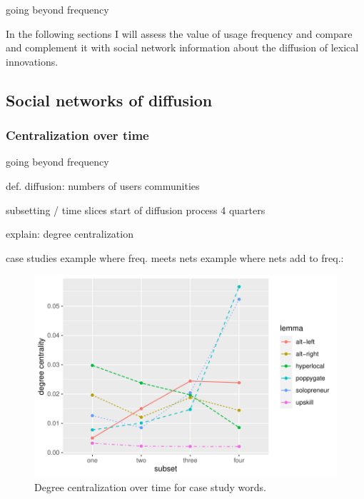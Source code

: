 \documentclass[
  a4paper,
  abstract=on,
  captions=tableabove
  ]{scrartcl}
\begin{document}
  going beyond frequency

    In the following sections I will assess the value of usage frequency and compare and complement it with social network information about the diffusion of lexical innovations.

  \subsection{Social networks of diffusion}
    \label{subsec:sna}

    \subsubsection{Centralization over time}

  going beyond frequency

  def. diffusion:
    numbers of users
    communities

  subsetting / time slices
    start of diffusion process
    4 quarters

  explain: degree centralization

  case studies
    example where freq. meets nets
    example where nets add to freq.: 


      \begin{figure}[H]
        \caption{Degree centralization over time for case study words.}
        \centering
        \includegraphics[width=\linewidth, height=.8\textheight, keepaspectratio]{img/cases_cent_diac.pdf}
      \end{figure}
\end{document}
